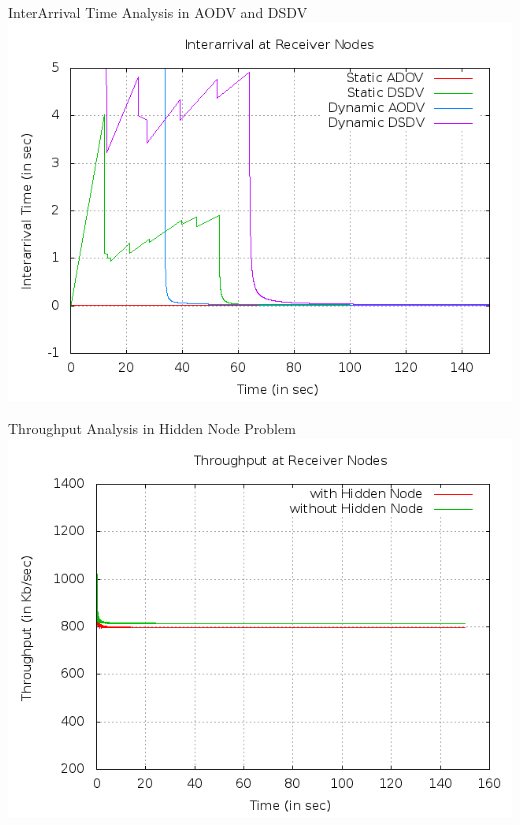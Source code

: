 \documentclass[a4paper,12pt]{report}
\begin{document}
\begin{center}
InterArrival Time Analysis in AODV and DSDV
 \includegraphics[width=15 cm,height=13 cm]{./interarrival.png}


\end{center}
\begin{center}
Throughput Analysis in Hidden Node Problem
 \includegraphics[width=15 cm,height=15 cm]{./hidden_throughput.png}


\end{center}
\end{document}
